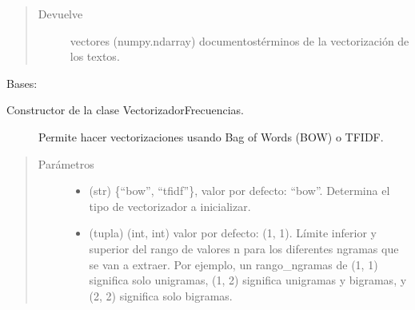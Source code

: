 \documentclass[letterpaper,10pt,openany,spanish]{sphinxmanual}
\begin{document}
\begin{fulllineitems}
\begin{fulllineitems}
\begin{quote}
\begin{description}
\begin{itemize}
\end{itemize}

\item[{Devuelve}] \leavevmode
vectores (numpy.ndarray) documentos\sphinxhyphen{}términos de la 
vectorización de los textos.

\end{description}\end{quote}

\end{fulllineitems}


\end{fulllineitems}


\begin{fulllineitems}
\label{\detokenize{funciones/vectorizacion:vectorizacion.VectorizadorFrecuencias}}
Bases: 
\begin{description}
\item[{Constructor de la clase VectorizadorFrecuencias.  }] \leavevmode
Permite hacer vectorizaciones usando Bag of Words (BOW) o TF\sphinxhyphen{}IDF.

\end{description}
\begin{quote}\begin{description}
\item[{Parámetros}] \leavevmode\begin{itemize}
\item {} 
 \textendash{} (str) \{“bow”, “tfidf”\}, valor por defecto: “bow”. 
Determina el tipo de vectorizador a inicializar.

\item {} 
 \textendash{} (tupla) (int, int) valor por defecto: (1, 1). 
Límite inferior y superior del rango de valores n para los 
diferentes n\sphinxhyphen{}gramas que se van a extraer. Por ejemplo, 
un rango\_ngramas de (1, 1) significa solo unigramas, (1, 2) 
significa unigramas y bigramas, y (2, 2) significa solo bigramas.


\end{itemize}
\end{description}
\end{quote}
\end{fulllineitems}
\end{document}
